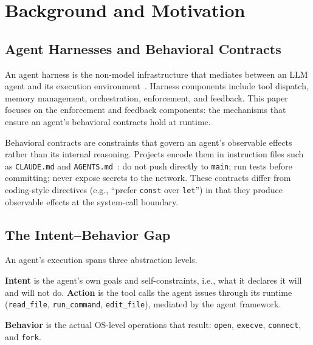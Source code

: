 \section{Background and Motivation}
\label{sec:motivation}

\subsection{Agent Harnesses and Behavioral Contracts}

An agent harness is the non-model infrastructure that mediates between an LLM
agent and its execution
environment~\cite{langchain-harness,fowler-harness}. Harness components
include tool dispatch, memory management, orchestration, enforcement, and
feedback. This paper focuses on the enforcement and feedback components:
the mechanisms that ensure an agent's behavioral contracts hold at runtime.

Behavioral contracts are constraints that govern an agent's observable
effects rather than its internal reasoning. Projects encode them in
instruction files such as \texttt{CLAUDE.md} and
\texttt{AGENTS.md}~\cite{chatlatanagulchai2025manifests,lulla2026agentsmd}:
do not push directly to \texttt{main}; run tests before committing; never
expose secrets to the network. These contracts differ from coding-style
directives (e.g., ``prefer \texttt{const} over \texttt{let}'') in that they
produce observable effects at the system-call boundary.

\subsection{The Intent--Behavior Gap}

An agent's execution spans three abstraction levels.

\textbf{Intent} is the agent's own goals and self-constraints, i.e., what it
declares it will and will not do. 
\textbf{Action} is the tool calls the agent issues through its runtime
(\texttt{read\_file}, \texttt{run\_command}, \texttt{edit\_file}), mediated
by the agent framework.

\textbf{Behavior} is the actual OS-level operations that result:
\texttt{open}, \texttt{execve}, \texttt{connect}, and \texttt{fork}.

